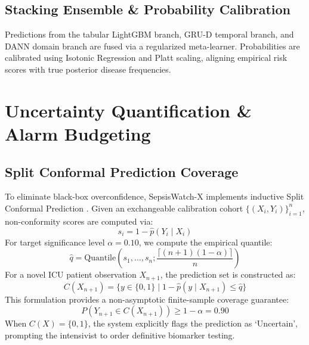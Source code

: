 \documentclass[conference]{IEEEtran}
\begin{document}
\subsection{Stacking Ensemble \& Probability Calibration}
Predictions from the tabular LightGBM branch, GRU-D temporal branch, and DANN domain branch are fused via a regularized meta-learner. Probabilities are calibrated using Isotonic Regression and Platt scaling, aligning empirical risk scores with true posterior disease frequencies.

\section{Uncertainty Quantification \& Alarm Budgeting}

\subsection{Split Conformal Prediction Coverage}
To eliminate black-box overconfidence, SepsisWatch-X implements inductive Split Conformal Prediction \cite{angelopoulos2021gentle}. Given an exchangeable calibration cohort $\{(X_i, Y_i)\}_{i=1}^n$, non-conformity scores are computed via:
\begin{equation}
    s_i = 1 - \hat{p}(Y_i \mid X_i)
\end{equation}
For target significance level $\alpha = 0.10$, we compute the empirical quantile:
\begin{equation}
    \hat{q} = \text{Quantile}\left(s_1, \dots, s_n; \frac{\lceil(n+1)(1-\alpha)\rceil}{n}\right)
\end{equation}
For a novel ICU patient observation $X_{n+1}$, the prediction set is constructed as:
\begin{equation}
    C(X_{n+1}) = \{y \in \{0, 1\} \mid 1 - \hat{p}(y \mid X_{n+1}) \le \hat{q}\}
\end{equation}
This formulation provides a non-asymptotic finite-sample coverage guarantee:
\begin{equation}
    P(Y_{n+1} \in C(X_{n+1})) \ge 1 - \alpha = 0.90
\end{equation}
When $C(X) = \{0, 1\}$, the system explicitly flags the prediction as `Uncertain', prompting the intensivist to order definitive biomarker testing.
\end{document}
